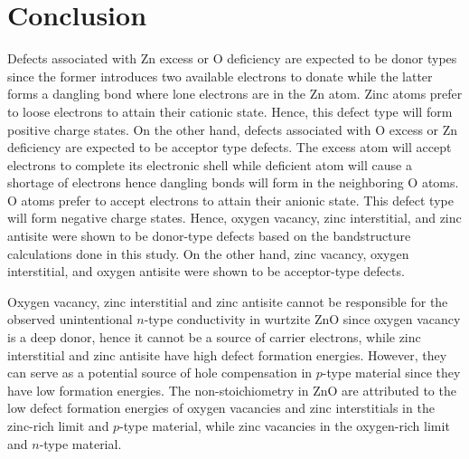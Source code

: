 \chapter{Conclusion} \label{chap:conclu}
Defects associated with Zn excess or O deficiency are expected to be donor types since the former introduces two available electrons to donate while the latter forms a dangling bond where lone electrons are in the Zn atom. Zinc atoms prefer to loose electrons to attain their cationic state. Hence, this defect type will form  positive charge states. On the other hand, defects associated with O excess or Zn deficiency are expected to be acceptor type defects. The excess  atom will accept electrons to complete its electronic shell while deficient  atom will cause a shortage of electrons hence  dangling bonds will form in the neighboring O atoms. O atoms prefer to accept electrons to attain their anionic state.
This defect type will form  negative charge states. Hence, oxygen vacancy, zinc interstitial, and zinc antisite were shown to be donor-type defects based on the bandstructure calculations done in this study. On the other hand, zinc vacancy, oxygen interstitial, and oxygen antisite were shown to be acceptor-type defects.

Oxygen vacancy,  zinc interstitial and zinc antisite cannot be responsible for the observed unintentional $n$-type conductivity in wurtzite ZnO since oxygen vacancy is a deep donor, hence it cannot be a source of carrier electrons, while  zinc interstitial and zinc antisite have high defect formation energies. However, they can serve as a potential source of hole compensation in  $p$-type material since they have low formation energies. The non-stoichiometry in ZnO are attributed to the low defect formation energies of oxygen vacancies and  zinc interstitials in the zinc-rich limit and $p$-type material, while zinc vacancies in the oxygen-rich limit and $n$-type material.




